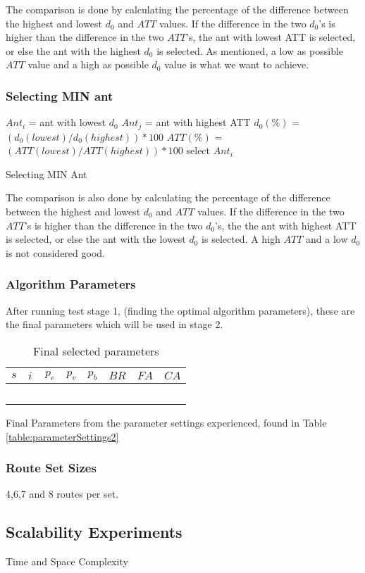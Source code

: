 The comparison is done by calculating the percentage of the difference between the highest and lowest $d_0$ and $ATT$ values. If the difference in the two $d_0$'s is higher than the difference in the two $ATT$'s, the ant with lowest ATT is selected, or else the ant with the highest $d_0$ is selected. As mentioned, a low as possible $ATT$ value and a high as possible $d_0$ value is what we want to achieve.

\subsubsection{Selecting MIN ant}
\begin{algorithm}[H]
$Ant_{i}$ = ant with lowest $d_0$\;
$Ant_{j}$ = ant with highest ATT\;
{
	$d_0(\%)$ = $(d_0(lowest) / d_0(highest))*100$\;
	$ATT(\%)$ = $(ATT(lowest) / ATT(highest))*100$\;
	{
		select $Ant_{i}$
	}
}
 \caption{Selecting MIN Ant}

\end{algorithm}

The comparison is also done by calculating the percentage of the difference between the highest and lowest $d_0$ and $ATT$ values. If the difference in the two $ATT$'s is higher than the difference in the two $d_0$'s, the the ant with highest ATT is selected, or else the ant with the lowest $d_0$ is selected. A high $ATT$ and a low $d_0$ is not considered good. 

\subsubsection{Algorithm Parameters}
After running test stage 1, (finding the optimal algorithm parameters), these are the final parameters which will be used in stage 2.

\begin{table}[H]
	\centering
    \begin{tabular}{|l|l|l|l|l|l|l|l|}
 	\hline
 	$s$ & $i$ & $p_{e}$ & $p_{v}$ & $p_{b}$ & $BR$ & $FA$ & $CA$  \\
 	\hline
    ~ & ~ & ~ & ~ & ~ & ~ & ~ & ~  \\
	\hline
    \end{tabular}
    \caption {Final selected parameters}
    Final Parameters from the parameter settings experienced, found in Table \vref{table:parameterSettings2}
    \label{table:finalParameters}
	\end{table}

\subsubsection{Route Set Sizes}
4,6,7 and 8 routes per set.

\subsection{Scalability Experiments}
Time and Space Complexity
